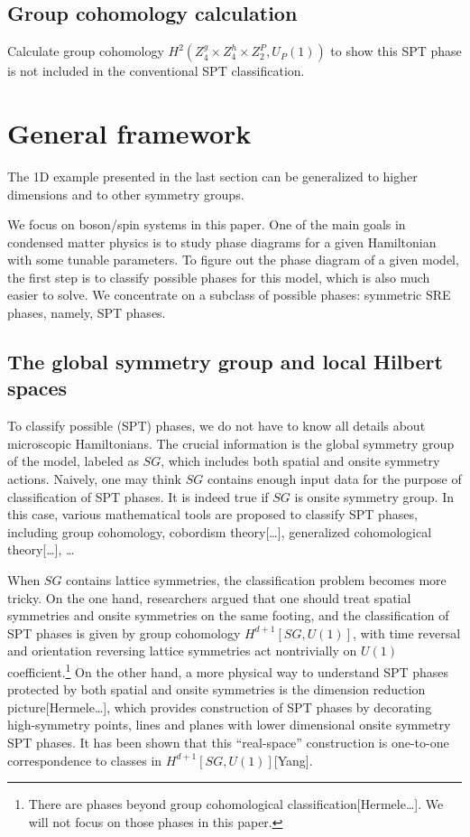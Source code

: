 \documentclass[reprint,amsmath,amssymb,aps,pra,]{revtex4-1}
\begin{document}
\subsection{Group cohomology calculation}
{\color{red} Calculate group cohomology $H^2(Z_4^g\times Z_4^h\times Z_2^P,U_P(1))$ to show this SPT phase is not included in the conventional SPT classification.}


\section{General framework}\label{sec:general_framework}
The 1D example presented in the last section can be generalized to higher dimensions and to other symmetry groups.

We focus on boson/spin systems in this paper.
One of the main goals in condensed matter physics is to study phase diagrams for a given Hamiltonian with some tunable parameters.
To figure out the phase diagram of a given model, the first step is to classify possible phases for this model, which is also much easier to solve.
We concentrate on a subclass of possible phases: symmetric SRE phases, namely, SPT phases.

\subsection{The global symmetry group and local Hilbert spaces}
To classify possible (SPT) phases, we do not have to know all details about microscopic Hamiltonians.
The crucial information is the global symmetry group of the model, labeled as $SG$, which includes both spatial and onsite symmetry actions.
Naively, one may think $SG$ contains enough input data for the purpose of classification of SPT phases.
It is indeed true if $SG$ is onsite symmetry group. 
In this case, various mathematical tools are proposed to classify SPT phases, including group cohomology\cite{ChenGuLiuWen2013}, cobordism theory[\ldots], generalized cohomological theory[\ldots], \ldots

When $SG$ contains lattice symmetries, the classification problem becomes more tricky.
On the one hand, researchers argued that one should treat spatial symmetries and onsite symmetries on the same footing, and the classification of SPT phases is given by group cohomology $H^{d+1}[SG,U(1)]$, with time reversal and orientation reversing lattice symmetries act nontrivially on $U(1)$ coefficient\cite{JiangRan2017,ThorngrenElse2018gauging}.\footnote{There are phases beyond group cohomological classification[Hermele\ldots]. We will not focus on those phases in this paper.}
On the other hand, a more physical way to understand SPT phases protected by both spatial and onsite symmetries is the dimension reduction picture[Hermele\ldots], which provides construction of SPT phases by decorating high-symmetry points, lines and planes with lower dimensional onsite symmetry SPT phases.
It has been shown that this ``real-space'' construction is one-to-one correspondence to classes in $H^{d+1}[SG,U(1)]$[Yang].
\end{document}
